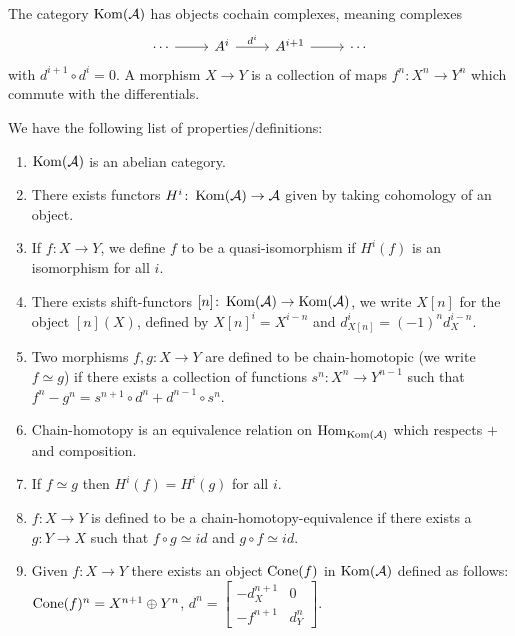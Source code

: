 \documentclass[a4paper, UKenglish]{report}
\begin{document}
The category $\operatorname{Kom}(\mathcal{A})$ has objects cochain complexes, meaning complexes 
\[
    \begin{tikzcd}
        \cdots \arrow[r] & A^i \arrow[r, "d^i"] & A^{i+1} \arrow[r] & \cdots
    \end{tikzcd}
\]
with $d^{i+1} \circ d^i = 0$. A morphism  $X \to Y$ is a collection of maps $f^n \colon X^n \to Y^n$ which commute with the differentials.

We have the following list of properties/definitions:

\begin{enumerate}
    \item $\operatorname{Kom}(\mathcal{A})$ is an abelian category.

    \item There exists functors $H^i \colon \operatorname{Kom}(\mathcal{A}) \to \mathcal{A}$ given by taking cohomology of an object.

    \item If $f \colon X \to Y$, we define $f$ to be a quasi-isomorphism if $H^i(f)$ is an isomorphism for all $i$.

    \item There exists shift-functors $[n] \colon \operatorname{Kom}(\mathcal{A}) \to \operatorname{Kom}(\mathcal{A})$, we write $X[n]$ for the object $[n](X)$, defined by $X[n]^i = X^{i - n}$ and $d_{X[n]}^i = (-1)^n d_X^{i-n}$.

    \item Two morphisms $f,g: X \to Y$ are defined to be chain-homotopic (we write $f \simeq g$) if there exists a collection of functions $s^n \colon X^n \to Y^{n-1}$ such that $f^n-g^n=s^{n+1} \circ d^n + d^{n-1} \circ s^n$.

    \item Chain-homotopy is an equivalence relation on $\operatorname{Hom}_{\operatorname{Kom}(\mathcal{A})}$ which respects $+$ and composition.

    \item If $f \simeq g$ then $H^i(f) = H^i(g)$ for all $i$.

    \item $f \colon X \to Y$ is defined to be a chain-homotopy-equivalence if there exists a $g \colon Y \to X$ such that $f \circ g \simeq id$ and $g \circ f \simeq id$.
    
    \item Given $f \colon X \to Y$ there exists an object $\operatorname{Cone}(f)$ in $\operatorname{Kom}(\mathcal{A})$ defined as follows: $\operatorname{Cone}(f)^n = X^{n+1} \oplus Y^n$, 
    $
        d^n 
        = 
        \begin{bmatrix} 
            -d_X^{n+1} & 0 \\ 
            -f^{n+1}   & d_Y^n 
        \end{bmatrix}.
    $


\end{enumerate}
\end{document}

